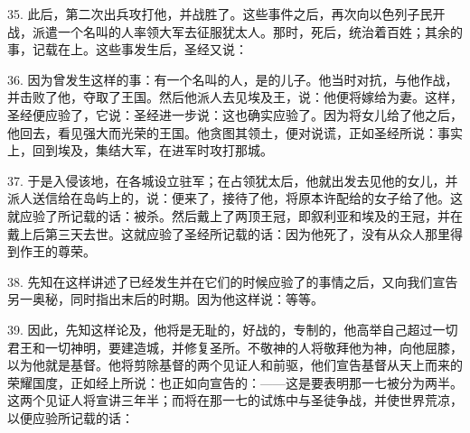 35. 此后，第二次出兵攻打他，并战胜了。这些事件之后，再次向以色列子民开战，派遣一个名叫的人率领大军去征服犹太人。那时，死后，统治着百姓；其余的事，记载在上。这些事发生后，圣经又说：\par

36. 因为曾发生这样的事：有一个名叫的人，是的儿子。他当时对抗，与他作战，并击败了他，夺取了王国。然后他派人去见埃及王，说：他便将嫁给为妻。这样，圣经便应验了，它说：圣经进一步说：这也确实应验了。因为将女儿给了他之后，他回去，看见强大而光荣的王国。他贪图其领土，便对说谎，正如圣经所说：事实上，回到埃及，集结大军，在进军时攻打那城。\par

37. 于是入侵该地，在各城设立驻军；在占领犹太后，他就出发去见他的女儿，并派人送信给在岛屿上的，说：便来了，接待了他，将原本许配给的女子给了他。这就应验了所记载的话：被杀。然后戴上了两顶王冠，即叙利亚和埃及的王冠，并在戴上后第三天去世。这就应验了圣经所记载的话：因为他死了，没有从众人那里得到作王的尊荣。\par

38. 先知在这样讲述了已经发生并在它们的时候应验了的事情之后，又向我们宣告另一奥秘，同时指出末后的时期。因为他这样说：等等。\par

39. 因此，先知这样论及，他将是无耻的，好战的，专制的，他高举自己超过一切君王和一切神明，要建造城，并修复圣所。不敬神的人将敬拜他为神，向他屈膝，以为他就是基督。他将剪除基督的两个见证人和前驱，他们宣告基督从天上而来的荣耀国度，正如经上所说：也正如向宣告的：——这是要表明那一七被分为两半。这两个见证人将宣讲三年半；而将在那一七的试炼中与圣徒争战，并使世界荒凉，以便应验所记载的话：\par

